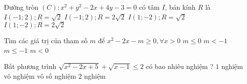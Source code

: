 \begin{ex}%
	Đường tròn $(C) : x^2 + y^2 - 2x + 4y - 3 = 0$ có tâm $I$, bán kính $R$ là
	\choice
	{$I(-1;2); R = \sqrt{2} $}
	{$I(-1;2); R = 2\sqrt{2}$}
	{$I(1;-2); R = \sqrt{2}$}
	{\True $I(1;-2); R = 2\sqrt{2}$}
\end{ex}

\begin{ex}%
Tìm các giá trị của tham số $m$ để $x^2 - 2x - m \geq 0, \forall x > 0$
	\choice
	{$m \leq 0$}
	{$m < -1$}
	{\True $m \leq -1$}
	{$ m < 0$}
\end{ex} 

\begin{ex}%
Bất phương trình $\sqrt{x^2 - 2x + 5} + \sqrt{x - 1} \leq 2$ có bao nhiêu nghiệm ?
\choice
{\True $1$ nghiệm}
{vô nghiệm}
{vô số nghiệm}
{$2$ nghiệm}
\end{ex}

